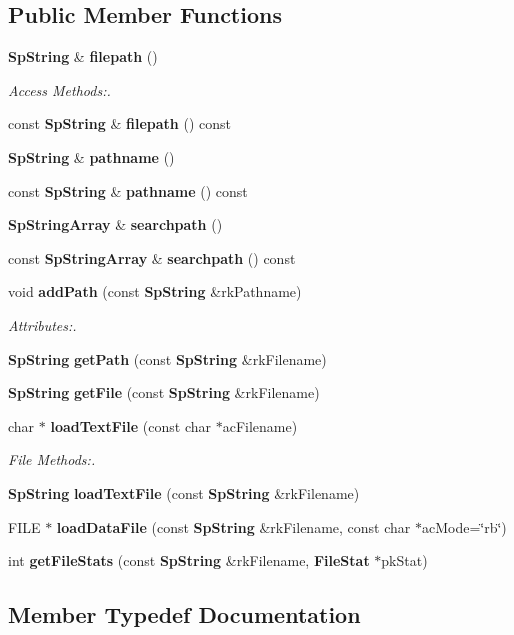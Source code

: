\subsection*{Public Member Functions}
\begin{CompactItemize}
\item 
{\bf Sp\-String} \& {\bf filepath} ()
\begin{CompactList}\small\item\em Access Methods:. \item\end{CompactList}\item 
const {\bf Sp\-String} \& {\bf filepath} () const
\item 
{\bf Sp\-String} \& {\bf pathname} ()
\item 
const {\bf Sp\-String} \& {\bf pathname} () const
\item 
{\bf Sp\-String\-Array} \& {\bf searchpath} ()
\item 
const {\bf Sp\-String\-Array} \& {\bf searchpath} () const
\item 
void {\bf add\-Path} (const {\bf Sp\-String} \&rk\-Pathname)
\begin{CompactList}\small\item\em Attributes:. \item\end{CompactList}\item 
{\bf Sp\-String} {\bf get\-Path} (const {\bf Sp\-String} \&rk\-Filename)
\item 
{\bf Sp\-String} {\bf get\-File} (const {\bf Sp\-String} \&rk\-Filename)
\item 
char $\ast$ {\bf load\-Text\-File} (const char $\ast$ac\-Filename)
\begin{CompactList}\small\item\em File Methods:. \item\end{CompactList}\item 
{\bf Sp\-String} {\bf load\-Text\-File} (const {\bf Sp\-String} \&rk\-Filename)
\item 
FILE $\ast$ {\bf load\-Data\-File} (const {\bf Sp\-String} \&rk\-Filename, const char $\ast$ac\-Mode=\char`\"{}rb\char`\"{})
\item 
int {\bf get\-File\-Stats} (const {\bf Sp\-String} \&rk\-Filename, {\bf File\-Stat} $\ast$pk\-Stat)
\end{CompactItemize}


\subsection{Member Typedef Documentation}
